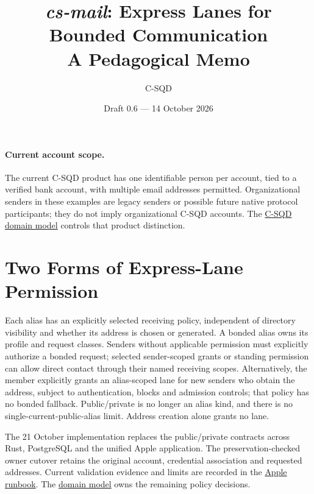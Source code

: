 \documentclass[11pt]{article}
\title{\textit{cs-mail}: Express Lanes for Bounded Communication\\
\large A Pedagogical Memo}
\author{C-SQD}
\date{Draft 0.6 --- 14 October 2026}
\begin{document}
\maketitle

\begin{center}
\end{center}

\paragraph{Current account scope.}
The current C-SQD product has one identifiable person per account, tied to a
verified bank account, with multiple email addresses permitted. Organizational
senders in these examples are legacy senders or possible future native protocol
participants; they do not imply organizational C-SQD accounts. The
\href{DOMAIN_MODEL.md}{C-SQD domain model} controls that product distinction.

\section{Two Forms of Express-Lane Permission}

Each alias has an explicitly selected receiving policy, independent of directory
visibility and whether its address is chosen or generated. A bonded alias owns its
profile and request classes. Senders without applicable permission must explicitly
authorize a bonded request; selected sender-scoped grants or standing permission
can allow direct contact through their named receiving scopes. Alternatively,
the member explicitly grants an alias-scoped lane for new senders who obtain the
address, subject to authentication, blocks and admission controls; that policy has
no bonded fallback. Public/private is no longer an alias kind, and there is no
single-current-public-alias limit. Address creation alone grants no lane.

The 21 October implementation replaces the public/private contracts across Rust,
PostgreSQL and the unified Apple application. The preservation-checked owner
cutover retains the original account, credential association and requested
addresses. Current validation evidence and limits are recorded in the
\href{apps/cs-mail-apple/README.md}{Apple runbook}. The
\href{DOMAIN_MODEL.md}{domain model} owns the remaining policy decisions.
\end{document}
